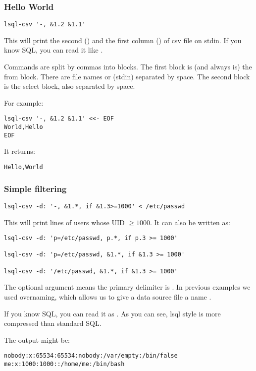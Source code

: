 \subsubsection{Hello World}
\begin{verbatim}
lsql-csv '-, &1.2 &1.1'
\end{verbatim}
This will print the second () and the first column () of csv file on stdin. If you know SQL, you can read it like .

Commands are split by commas into blocks. The first block is (and always is) the from block. There are file names or \icode{-} (stdin) separated by space. The second block is the select block, also separated by space.

For example:
\begin{verbatim}
lsql-csv '-, &1.2 &1.1' <<- EOF
World,Hello
EOF
\end{verbatim}
It returns:
\begin{verbatim}
Hello,World
\end{verbatim}


\subsubsection{Simple filtering}

\begin{verbatim}
lsql-csv -d: '-, &1.*, if &1.3>=1000' < /etc/passwd
\end{verbatim}
This will print lines of users whose UID $\geq 1000$. It can also be written as:
\begin{verbatim}
lsql-csv -d: 'p=/etc/passwd, p.*, if p.3 >= 1000'
    
lsql-csv -d: 'p=/etc/passwd, &1.*, if &1.3 >= 1000'

lsql-csv -d: '/etc/passwd, &1.*, if &1.3 >= 1000'
\end{verbatim}
The  optional argument means the primary delimiter is \icode{:}. In previous examples we used overnaming, which allows us to give a data source file  a name .

If you know SQL, you can read it as . As you can see, lsql style is more compressed than standard SQL.

The output might be:
\begin{verbatim}
nobody:x:65534:65534:nobody:/var/empty:/bin/false
me:x:1000:1000::/home/me:/bin/bash
\end{verbatim}

